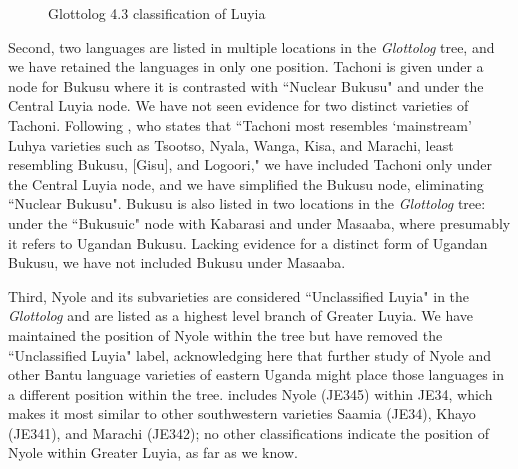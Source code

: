\documentclass[output=paper]{langscibook}
\begin{document}
\begin{figure}
   
  \caption{Glottolog 4.3 classification of Luyia \citep{glottolog}}
  \label{fig:9:Glottolog}
\end{figure}

Second, two languages are listed in multiple locations in the \textit{Glottolog} tree, and we have retained the languages in only one position. Tachoni is given under a node for Bukusu where it is contrasted with ``Nuclear Bukusu" and under the Central Luyia node. We have not seen evidence for two distinct varieties of Tachoni. Following \citet[305]{odden_tachoni_2009}, who states that ``Tachoni most resembles `mainstream' Luhya varieties such as Tsootso, Nyala, Wanga, Kisa, and Marachi, least resembling Bukusu, [Gisu], and Logoori," we have included Tachoni only under the Central Luyia node, and we have simplified the Bukusu node, eliminating ``Nuclear Bukusu". Bukusu is also listed in two locations in the \textit{Glottolog} tree: under the ``Bukusuic" node with Kabarasi and under Masaaba, where presumably it refers to Ugandan Bukusu. Lacking evidence for a distinct form of Ugandan Bukusu, we have not included Bukusu under Masaaba.  

Third, Nyole and its subvarieties are considered ``Unclassified Luyia" in the \textit{Glottolog} and are listed as a highest level branch of Greater Luyia. We have maintained the position of Nyole within the tree but have removed the ``Unclassified Luyia" label, acknowledging here that further study of Nyole and other Bantu language varieties of eastern Uganda might place those languages in a different position within the tree. \citet{maho_nugl_2009} includes Nyole (JE345) within JE34, which makes it most similar to other southwestern varieties Saamia (JE34), Khayo (JE341), and Marachi (JE342); no other classifications indicate the position of Nyole within Greater Luyia, as far as we know.
\end{document}
